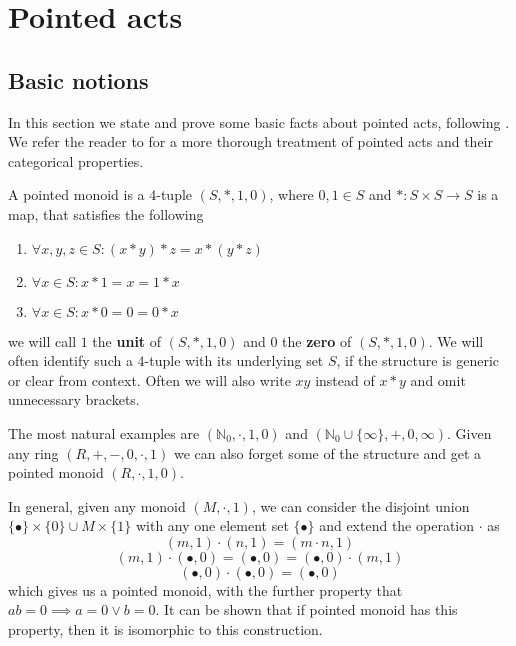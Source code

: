 \chapter{Pointed acts}
\section{Basic notions}
    In this section we state and prove some basic facts about pointed acts, following \cite{Kilp00}. We refer the reader to \cite{Kilp00} for a more thorough treatment of pointed acts and their categorical properties.
\begin{definition}
    A pointed monoid is a $4$-tuple $(S,\ast,1,0)$, where $0,1\in S$ and $\ast: S\times S \to S$ is a map, that satisfies the following
    \begin{enumerate}
        \item $\forall x,y,z\in S: (x\ast y)\ast z = x\ast(y\ast z)$
        \item $\forall x\in S: x\ast 1 = x = 1\ast x$
        \item $\forall x\in S: x\ast 0 = 0 = 0\ast x$
    \end{enumerate}
    we will call $1$ the \textbf{unit} of $(S,\ast,1,0)$ and $0$ the \textbf{zero} of $(S,\ast,1,0)$. We will often identify
    such a $4$-tuple with its underlying set $S$, if the structure is generic or clear from context. Often we will also write
    $xy$ instead of $x\ast y$ and omit unnecessary brackets.
\end{definition}
\begin{example}
    The most natural examples are $(\mathbb{N}_0, \cdot, 1,0)$ and $(\mathbb{N}_0\cup\{\infty\}, +,0,\infty)$. Given any ring $(R,+,-,0,\cdot,1)$ 
    we can also forget some of the structure and get a pointed monoid $(R,\cdot,1,0)$.  
\end{example}
\begin{example}
    In general, given any monoid $(M,\cdot,1)$, we can consider the disjoint union $\{\bullet\}\times\{0\}\cup M\times\{1\}$ with any one element set
    $\{\bullet\}$ and extend the operation $\cdot$ as
    \[
        (m,1)\cdot(n,1) = (m\cdot n,1)
    \]
    \[
        (m,1)\cdot(\bullet, 0) = (\bullet, 0) = (\bullet,0)\cdot(m,1)
    \]
    \[
        (\bullet,0)\cdot(\bullet,0) = (\bullet,0)
    \]
    which gives us a pointed monoid, with the further property that $ab=0 \implies a=0 \lor b=0$. It can be shown that if pointed monoid 
    has this property, then it is isomorphic to this construction.
\end{example}

